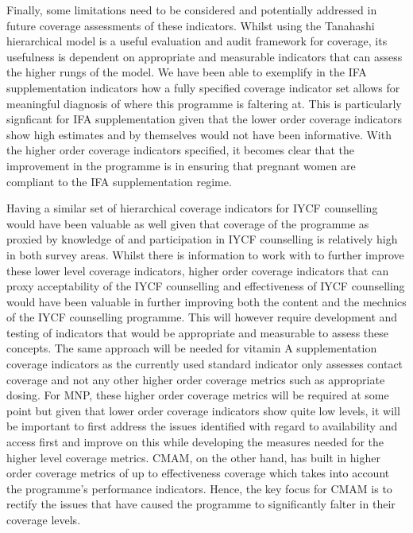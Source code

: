 \documentclass[12pt,a4paper]{article}
\begin{document}
Finally, some limitations need to be considered and potentially addressed in future coverage assessments of these indicators. Whilst using the Tanahashi hierarchical model is a useful evaluation and audit framework for coverage, its usefulness is dependent on appropriate and measurable indicators that can assess the higher rungs of the model. We have been able to exemplify in the IFA supplementation indicators how a fully specified coverage indicator set allows for meaningful diagnosis of where this programme is faltering at. This is particularly signficant for IFA supplementation given that the lower order coverage indicators show high estimates and by themselves would not have been informative. With the higher order coverage indicators specified, it becomes clear that the improvement in the programme is in ensuring that pregnant women are compliant to the IFA supplementation regime.

Having a similar set of hierarchical coverage indicators for IYCF counselling would have been valuable as well given that coverage of the programme as proxied by knowledge of and participation in IYCF counselling is relatively high in both survey areas. Whilst there is information to work with to further improve these lower level coverage indicators, higher order coverage indicators that can proxy acceptability of the IYCF counselling and effectiveness of IYCF counselling would have been valuable in further improving both the content and the mechnics of the IYCF counselling programme. This will however require development and testing of indicators that would be appropriate and measurable to assess these concepts. The same approach will be needed for vitamin A supplementation coverage indicators as the currently used standard indicator only assesses contact coverage and not any other higher order coverage metrics such as appropriate dosing. For MNP, these higher order coverage metrics will be required at some point but given that lower order coverage indicators show quite low levels, it will be important to first address the issues identified with regard to availability and access first and improve on this while developing the measures needed for the higher level coverage metrics. CMAM, on the other hand, has built in higher order coverage metrics of up to effectiveness coverage which takes into account the programme's performance indicators. Hence, the key focus for CMAM is to rectify the issues that have caused the programme to significantly falter in their coverage levels.

\newpage
\end{document}

